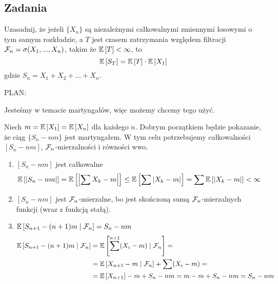 \subsection{Zadania}
\setcounter{problem}{0}

\begin{problem}
  Uzasadnij, że jeżeli $\{X_n\}$ są niezależnymi całkowalnymi zmiennymi losowymi o tym samym rozkładzie, a $T$ jest czasem zatrzymania względem filtracji $\mathcal{F}_n=\sigma(X_1,...,X_n)$, takim że $\expected{T}<\infty$, to 
  $$\expected{S_T}=\expected{T}\cdot\expected{X_1}$$
  gdzie $S_n=X_1+X_2+...+X_n$.
\end{problem}

\begin{solution}
  PLAN:
  \begin{center}
  \end{center}

  Jesteśmy w temacie martyngałów, więc możemy chcemy tego użyć.

  Niech $m=\expected{X_1}=\expected{X_n}$ dla każdego $n$. Dobrym początkiem będzie pokazanie, że ciąg $\{S_n-nm\}$ jest martyngałem. W tym celu potrzebujemy całkowalności $[S_n-nm]$, $\mathcal{F}_n$-mierzalności i równości wwo.
  \begin{enumerate}
    \item $[S_n-nm]$ jest całkowalne
    $$\expected{|S_n-nm|}=\expected{\left|\sum X_k-m\right|}\leq\expected{\sum|X_k-m|}=\sum\expected{|X_k-m|}<\infty$$
  \item $[S_n-nm]$ jest $\mathcal{F}_n$-mierzalne, bo jest skończoną sumą $\mathcal{F}_n$-mierzalnych funkcji (wraz z funkcją stałą).
    \item $\expected{S_{n+1}-(n+1)m}{\set{F}_n}=S_n-nm$
      \begin{align*}
        \expected{S_{n+1}-(n+1)m}{\set{F}_n}&=\expected{\sum^{n+1} (X_i-m)}{\set{F}_n}=\\ 
                                            &=\expected{X_{n+1}-m}{\set{F}_n}+\sum(X_i-m)=\\ 
                                            &=\expected{X_{n+1}}-m+S_n-nm=m-m+S_n-nm=S_n-nm
      \end{align*}
  \end{enumerate}


\end{solution}
